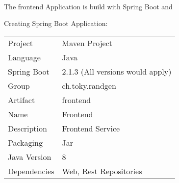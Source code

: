 The frontend Application is build with Spring Boot and 

Creating Spring Boot Application:
\begin{tabbing}
\begin{tabular}{ll}
Project & Maven Project \\
Language & Java \\
Spring Boot & 2.1.3 (All versions would apply) \\
Group & ch.toky.randgen \\
Artifact & frontend \\
Name & Frontend \\
Description & Frontend Service \\
Packaging & Jar \\
Java Version & 8 \\
Dependencies & Web, Rest Repositories
\end{tabular}
\end{tabbing}